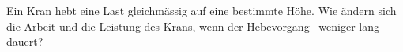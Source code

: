 Ein Kran hebt eine Last gleichmässig auf eine bestimmte Höhe. Wie ändern sich die Arbeit und die Leistung des Krans, wenn der Hebevorgang \rtO\ weniger lang dauert?
